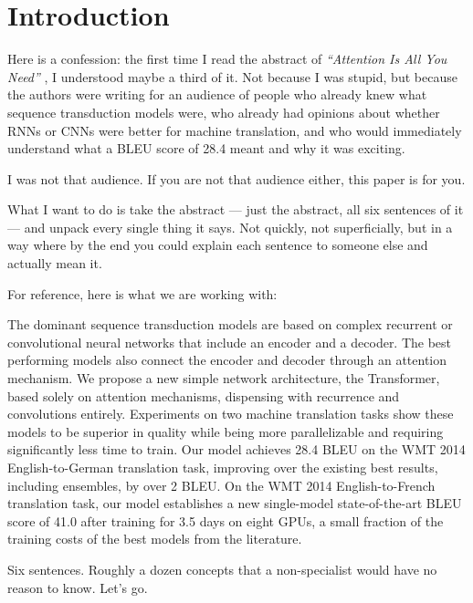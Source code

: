 \section{Introduction}

Here is a confession: the first time I read the abstract of \emph{``Attention Is All You Need''} \cite{vaswani2017attention}, I understood maybe a third of it.
Not because I was stupid, but because the authors were writing for an audience of people who already knew what sequence transduction models were, who already had opinions about whether RNNs or CNNs were better for machine translation, and who would immediately understand what a BLEU score of 28.4 meant and why it was exciting.

I was not that audience.
If you are not that audience either, this paper is for you.

What I want to do is take the abstract --- just the abstract, all six sentences of it --- and unpack every single thing it says.
Not quickly, not superficially, but in a way where by the end you could explain each sentence to someone else and actually mean it.

For reference, here is what we are working with:

\begin{tcolorbox}[colback=gray!5!white, colframe=gray!60!black, title=The Original Abstract]
\small
The dominant sequence transduction models are based on complex recurrent or convolutional neural networks that include an encoder and a decoder. The best performing models also connect the encoder and decoder through an attention mechanism. We propose a new simple network architecture, the Transformer, based solely on attention mechanisms, dispensing with recurrence and convolutions entirely. Experiments on two machine translation tasks show these models to be superior in quality while being more parallelizable and requiring significantly less time to train. Our model achieves 28.4 BLEU on the WMT 2014 English-to-German translation task, improving over the existing best results, including ensembles, by over 2 BLEU. On the WMT 2014 English-to-French translation task, our model establishes a new single-model state-of-the-art BLEU score of 41.0 after training for 3.5 days on eight GPUs, a small fraction of the training costs of the best models from the literature.
\end{tcolorbox}

Six sentences.
Roughly a dozen concepts that a non-specialist would have no reason to know.
Let's go.
